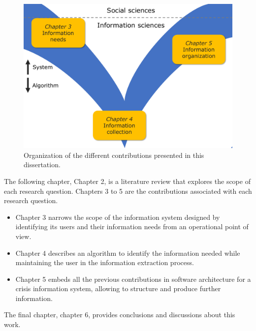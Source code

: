 \begin{figure}[htb]
    \includegraphics[width=\textwidth]{figures/chap-1/dissertation-plan.pdf}
    \caption{Organization of the different contributions presented in this dissertation.}
    \label{context:plan}
\end{figure}

The following chapter, Chapter 2, is a literature review that explores the scope of each research question.
Chapters 3 to 5 are the contributions associated with each research question.

\begin{itemize}
    \item Chapter 3 narrows the scope of the information system designed by identifying its users and their information needs from an operational point of view.
    \item Chapter 4 describes an algorithm to identify the information needed while maintaining the user in the information extraction process.
    \item Chapter 5 embeds all the previous contributions in software architecture for a crisis information system, allowing to structure and produce further information.
\end{itemize}

The final chapter, chapter 6, provides conclusions and discussions about this work.

